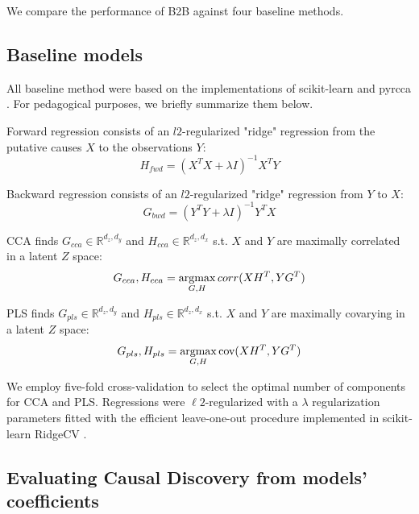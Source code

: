 We compare the performance of B2B against four baseline methods.
%

\subsection{Baseline models}

All baseline method were based on the implementations of scikit-learn \citep{sklearn} and pyrcca
\citep{bilenko2016pyrcca}. For pedagogical purposes, we briefly summarize them below.

Forward regression consists of an $l2$-regularized "ridge" regression from the
putative causes $X$ to the observations $Y$: \begin{equation} H_{fwd} = (X^T X
+\lambda I)^{-1} X^T Y \end{equation}

Backward regression consists of an $l2$-regularized "ridge" regression from $Y$
to $X$: \begin{equation} G_{bwd} = (Y^T Y +\lambda I)^{-1} Y^T X \end{equation}

CCA finds $G_{cca}\in\mathbb{R}^{d_z, d_y}$ and $H_{cca}\in\mathbb{R}^{d_z, d_x}$
s.t.
$X$ and $Y$ are maximally correlated in a latent $Z$ space:
\begin{equation} G_{cca},H_{cca} = \operatorname*{argmax}_{G,H} corr(XH^T, YG^T) \end{equation}

PLS finds $G_{pls}\in\mathbb{R}^{d_z, d_y}$ and $H_{pls}\in\mathbb{R}^{d_z, d_x}$
s.t.
$X$ and $Y$ are maximally covarying in a latent $Z$ space:
\begin{equation} G_{pls},H_{pls} = \operatorname*{argmax}_{G,H} \text{cov}(XH^T, YG^T) \end{equation}

We employ five-fold cross-validation to select the optimal number of components
for CCA and PLS. Regressions were $\ell2$-regularized with a $\lambda$ regularization
parameters fitted with the efficient leave-one-out procedure implemented in
scikit-learn RidgeCV \citep{sklearn}.

\subsection{Evaluating Causal Discovery from models' coefficients}

